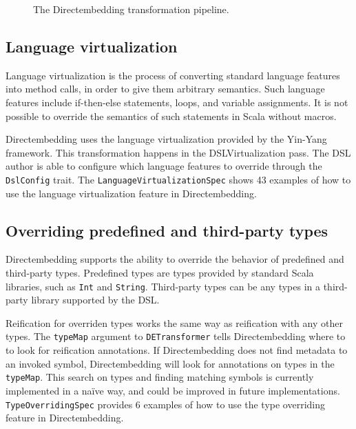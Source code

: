 \begin{figure}
    \centering
    \caption{The Directembedding transformation pipeline.}\label{fig:pipeline}
\end{figure}

\subsection{Language virtualization} %
\label{sub:LanguageVirtualization}
Language virtualization is the process of converting standard language features into method calls, in order to give them arbitrary semantics.
Such language features include if-then-else statements, loops, and variable assignments.
It is not possible to override the semantics of such statements in Scala without macros.

Directembedding uses the language virtualization provided by the Yin-Yang~\autocite{jovanovic_yin-yang:_2014} framework.
This transformation happens in the DSLVirtualization pass.
The DSL author is able to configure which language features to override through the \texttt{DslConfig} trait.
The \texttt{LanguageVirtualizationSpec} shows 43 examples of how to use the language virtualization feature in Directembedding.

\subsection{Overriding predefined and third-party types} %
\label{sub:Overridingpredefinedandthirdpartytypes}
Directembedding supports the ability to override the behavior of predefined and third-party types.
Predefined types are types provided by standard Scala libraries, such as \texttt{Int} and \texttt{String}.
Third-party types can be any types in a third-party library supported by the DSL.\

\begin{sloppypar}
    Reification for overriden types works the same way as reification with any other types.
    The \texttt{typeMap} argument to \texttt{DETransformer} tells Directembedding where to to look for reification annotations.
    If Directembedding does not find metadata to an invoked symbol, Directembedding will look for annotations on types in the \texttt{typeMap}.
    This search on types and finding matching symbols is currently implemented in a naïve way, and could be improved in future implementations.
    \texttt{TypeOverridingSpec} provides 6 examples of how to use the type overriding feature in Directembedding.
\end{sloppypar}

